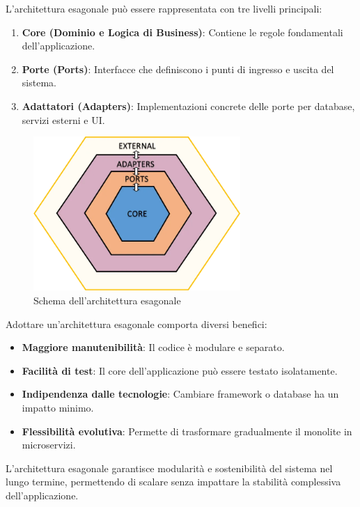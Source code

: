 L’architettura esagonale può essere rappresentata con tre livelli principali:
\begin{enumerate}
    \item \textbf{Core (Dominio e Logica di Business)}: Contiene le regole fondamentali dell’applicazione.
    \item \textbf{Porte (Ports)}: Interfacce che definiscono i punti di ingresso e uscita del sistema.
    \item \textbf{Adattatori (Adapters)}: Implementazioni concrete delle porte per database, servizi esterni e UI.
\end{enumerate}
\begin{figure}[H]
    \centering
    \includegraphics[width=0.7\textwidth]{./img/hexagonal_architecture.png}
    \caption{Schema dell'architettura esagonale}
    \label{fig:hex_arch}
\end{figure}

Adottare un'architettura esagonale comporta diversi benefici:
\begin{itemize}
    \item \textbf{Maggiore manutenibilità}: Il codice è modulare e separato.
    \item \textbf{Facilità di test}: Il core dell’applicazione può essere testato isolatamente.
    \item \textbf{Indipendenza dalle tecnologie}: Cambiare framework o database ha un impatto minimo.
    \item \textbf{Flessibilità evolutiva}: Permette di trasformare gradualmente il monolite in microservizi.
\end{itemize}

L’architettura esagonale garantisce modularità e sostenibilità del sistema nel lungo termine, permettendo di scalare senza impattare la stabilità complessiva dell’applicazione.

